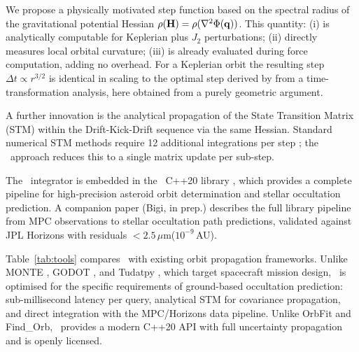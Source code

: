 We propose a physically motivated step function based on the spectral
radius of the gravitational potential Hessian
$\rho(\mathbf{H}) = \rho(\nabla^2\Phi(\mathbf{q}))$.
This quantity: (i) is analytically computable for Keplerian plus
$J_2$ perturbations; (ii) directly measures local orbital curvature;
(iii) is already evaluated during force computation, adding no overhead.
For a Keplerian orbit the resulting step $\Delta t \propto r^{3/2}$
is identical in scaling to the optimal step derived by
\citet{PretoTremaine1999} from a time-transformation analysis, here
obtained from a purely geometric argument.

A further innovation is the analytical propagation of the State
Transition Matrix (STM) within the Drift-Kick-Drift sequence via
the same Hessian. Standard numerical STM methods require 12
additional integrations per step \citep[\S4.2]{bigi_astdyn_2025};
the \AAS\ approach reduces this to a single matrix update per sub-step.

The \AAS\ integrator is embedded in the \astdyn\ C++20 library
\citep{bigi_astdyn_2025}, which provides a complete pipeline for
high-precision asteroid orbit determination and stellar occultation
prediction. 
A companion paper (Bigi, in prep.) describes the full
library pipeline from MPC observations to stellar occultation
path predictions, validated against JPL Horizons with
residuals $< 2.5\,\mu$m($10^{-9}$\,AU).

Table~\ref{tab:tools} compares \astdyn\ with existing
orbit propagation frameworks. Unlike MONTE \citep{evans2018},
GODOT \citep{godot2020}, and Tudatpy \citep{dirkx2022},
which target spacecraft mission design, \astdyn\ is optimised
for the specific requirements of ground-based occultation
prediction: sub-millisecond latency per query, analytical STM
for covariance propagation, and direct integration with the
MPC/Horizons data pipeline. Unlike OrbFit \citep{milani2010}
and Find\_Orb, \astdyn\ provides a modern C++20 API with
full uncertainty propagation and is openly licensed.

